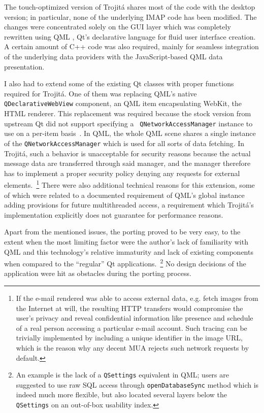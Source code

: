 \documentclass[trojita]{subfiles}
\begin{document}
The touch-optimized version of Trojitá shares most of the code with the desktop version; in particular, none of the
underlying IMAP code has been modified.  The changes were concentrated solely on the GUI layer which was completely
rewritten using QML \cite{qml}, Qt's declarative language for fluid user interface creation.  A certain amount of C++
code was also required, mainly for seamless integration of the underlying data providers with the JavaScript-based QML
data presentation.

I also had to extend some of the existing Qt classes with proper functions required for Trojitá.  One of them was
replacing QML's native {\tt QDeclarativeWebView} component, an QML item encapsulating WebKit, the HTML renderer.  This
replacement was required because the stock version from upstream Qt did not support specifying a {\tt
QNetworkAccessManager} instance to use on a per-item basis~\cite{jkt-qdeclarativewebview}.  In QML, the whole QML scene
shares a single instance of the {\tt QNetworkAccessManager} which is used for all sorts of data fetching.  In Trojitá,
such a behavior is unacceptable for security reasons because the actual message data are transferred through said
manager, and the manager therefore has to implement a proper security policy denying any requests for external
elements.~\footnote{If the e-mail rendered was able to access external data, e.g. fetch images from the Internet at
will, the resulting HTTP transfers would compromise the user's privacy and reveal confidential information like presence
and schedule of a real person accessing a particular e-mail account.  Such tracing can be trivially implemented by
including a unique identifier in the image URL, which is the reason why any decent MUA rejects such network requests by
default.}  There were also additional technical reasons for this extension, some of which were related to a documented
requirement of QML's global instance adding provisions for future multithreaded access, a requirement which Trojitá's
implementation explicitly does not guarantee for performance reasons.

Apart from the mentioned issues, the porting proved to be very easy, to the extent when the most limiting factor were
the author's lack of familiarity with QML and this technology's relative immaturity and lack of existing components when
compared to the ``regular'' Qt applications.~\footnote{An example is the lack of a {\tt QSettings} equivalent in QML;
users are suggested to use raw SQL access through {\tt openDatabaseSync} method which is indeed much more flexible, but
also located several layers below the {\tt QSettings} on an out-of-box usability index.}  No design decisions of the
application were hit as obstacles during the porting process.
\end{document}
